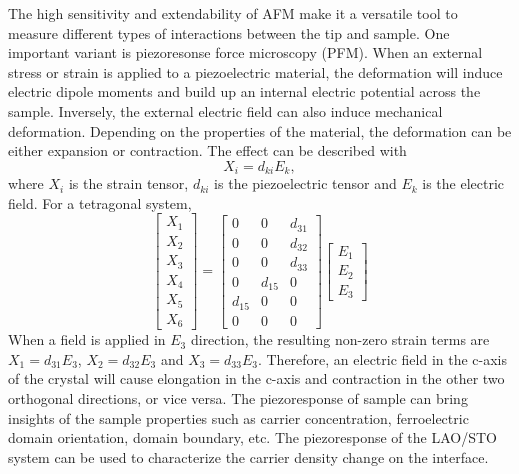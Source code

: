 \documentclass[pdflatex, sectionletters, 12pt, final, phd]{pittetd}    %
\begin{document}
The high sensitivity and extendability of AFM make it a versatile tool to measure different types of interactions between the tip and sample. One important variant is piezoresonse force microscopy (PFM). When an external stress or strain is applied to a piezoelectric material, the deformation will induce electric dipole moments and build up an internal electric potential across the sample. Inversely, the external electric field can also induce mechanical deformation. Depending on the properties of the material, the deformation can be either expansion or contraction. The effect can be described with
$$
X_i = d_{ki}E_k,
$$
where $X_i$ is the strain tensor, $d_{ki}$ is the piezoelectric tensor and $E_k$ is the electric field. For a tetragonal system, 
$$
\begin{bmatrix}
X_{1} \\
X_{2} \\
X_{3} \\
X_{4} \\
X_{5} \\
X_{6}
\end{bmatrix} =
\begin{bmatrix}
0 & 0 & d_{31} \\
0 & 0 & d_{32} \\
0 & 0 & d_{33} \\
0 & d_{15} & 0 \\
d_{15} & 0 & 0 \\
0 & 0 & 0
\end{bmatrix}
\begin{bmatrix}
E_{1} \\
E_{2} \\
E_{3}
\end{bmatrix}
$$
When a field is applied in $E_3$ direction, the resulting non-zero strain terms are $X_1 = d_{31}E_3$, $X_2 = d_{32}E_3$ and $X_3 = d_{33}E_3$. Therefore, an electric field in the c-axis of the crystal will cause elongation in the c-axis and contraction in the other two orthogonal directions, or vice versa. The piezoresponse of sample can bring insights of the sample properties such as carrier concentration\cite{huang2013direct, guo2016correlations}, ferroelectric domain orientation\cite{soergel2011piezoresponse}, domain boundary\cite{potnis2011review}, etc. The piezoresponse of the LAO/STO system can be used to characterize the carrier density change on the interface.
\end{document}
